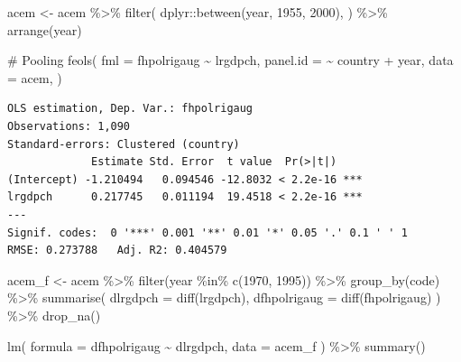 \documentclass[
  a4paper,
  DIV=11,
  oneside]{scrreprt}
\newenvironment{Shaded}{\begin{snugshade}}{\end{snugshade}}
\newcommand{\AttributeTok}[1]{\textcolor[rgb]{0.40,0.45,0.13}{#1}}
\newcommand{\CommentTok}[1]{\textcolor[rgb]{0.37,0.37,0.37}{#1}}
\newcommand{\DecValTok}[1]{\textcolor[rgb]{0.68,0.00,0.00}{#1}}
\newcommand{\FunctionTok}[1]{\textcolor[rgb]{0.28,0.35,0.67}{#1}}
\newcommand{\NormalTok}[1]{\textcolor[rgb]{0.00,0.23,0.31}{#1}}
\newcommand{\OtherTok}[1]{\textcolor[rgb]{0.00,0.23,0.31}{#1}}
\newcommand{\SpecialCharTok}[1]{\textcolor[rgb]{0.37,0.37,0.37}{#1}}
\begin{document}
\begin{Shaded}
\begin{Highlighting}[]
\NormalTok{acem }\OtherTok{\textless{}{-}}\NormalTok{ acem }\SpecialCharTok{\%\textgreater{}\%} 
  \FunctionTok{filter}\NormalTok{(}
\NormalTok{    dplyr}\SpecialCharTok{::}\FunctionTok{between}\NormalTok{(year, }\DecValTok{1955}\NormalTok{, }\DecValTok{2000}\NormalTok{),}
\NormalTok{    ) }\SpecialCharTok{\%\textgreater{}\%}
  \FunctionTok{arrange}\NormalTok{(year) }
\end{Highlighting}
\end{Shaded}

\begin{Shaded}
\begin{Highlighting}[]
\CommentTok{\# Pooling}
\FunctionTok{feols}\NormalTok{(}
  \AttributeTok{fml =}\NormalTok{ fhpolrigaug }\SpecialCharTok{\textasciitilde{}}\NormalTok{ lrgdpch,}
  \AttributeTok{panel.id =} \SpecialCharTok{\textasciitilde{}}\NormalTok{ country }\SpecialCharTok{+}\NormalTok{ year,}
  \AttributeTok{data =}\NormalTok{ acem, }
\NormalTok{)}
\end{Highlighting}
\end{Shaded}

\begin{verbatim}
OLS estimation, Dep. Var.: fhpolrigaug
Observations: 1,090
Standard-errors: Clustered (country) 
             Estimate Std. Error  t value  Pr(>|t|)    
(Intercept) -1.210494   0.094546 -12.8032 < 2.2e-16 ***
lrgdpch      0.217745   0.011194  19.4518 < 2.2e-16 ***
---
Signif. codes:  0 '***' 0.001 '**' 0.01 '*' 0.05 '.' 0.1 ' ' 1
RMSE: 0.273788   Adj. R2: 0.404579
\end{verbatim}

\begin{Shaded}
\begin{Highlighting}[]
\NormalTok{acem\_f }\OtherTok{\textless{}{-}}\NormalTok{ acem }\SpecialCharTok{\%\textgreater{}\%}
  \FunctionTok{filter}\NormalTok{(year }\SpecialCharTok{\%in\%} \FunctionTok{c}\NormalTok{(}\DecValTok{1970}\NormalTok{, }\DecValTok{1995}\NormalTok{)) }\SpecialCharTok{\%\textgreater{}\%}
  \FunctionTok{group\_by}\NormalTok{(code) }\SpecialCharTok{\%\textgreater{}\%}
  \FunctionTok{summarise}\NormalTok{(}
    \AttributeTok{dlrgdpch =} \FunctionTok{diff}\NormalTok{(lrgdpch),}
    \AttributeTok{dfhpolrigaug =} \FunctionTok{diff}\NormalTok{(fhpolrigaug)}
\NormalTok{    ) }\SpecialCharTok{\%\textgreater{}\%}
  \FunctionTok{drop\_na}\NormalTok{()}

\FunctionTok{lm}\NormalTok{(}
  \AttributeTok{formula =}\NormalTok{ dfhpolrigaug }\SpecialCharTok{\textasciitilde{}}\NormalTok{ dlrgdpch,}
  \AttributeTok{data =}\NormalTok{ acem\_f}
\NormalTok{) }\SpecialCharTok{\%\textgreater{}\%} 
  \FunctionTok{summary}\NormalTok{()}
\end{Highlighting}
\end{Shaded}
\end{document}
